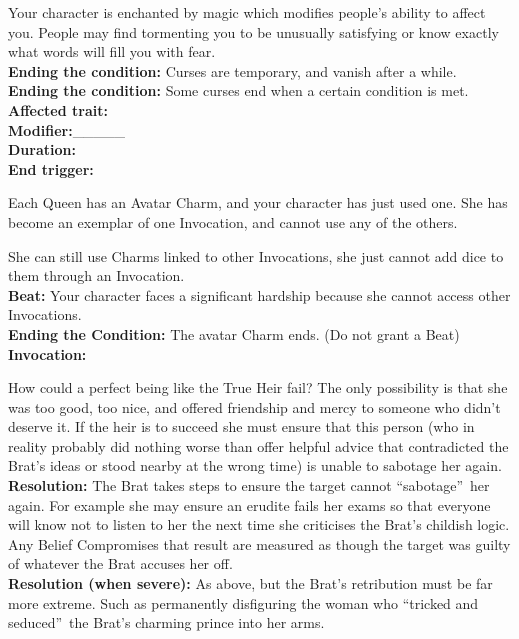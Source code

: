 \documentclass[10pt, frontgrid, backgrid]{flacards}
\begin{document}
{Your character is enchanted by magic which modifies people's ability to affect you. People may find tormenting you to be unusually satisfying or know exactly what words will fill you with fear.\\
\textbf{Ending the condition:} Curses are temporary, and vanish after a while.\\
\textbf{Ending the condition:} Some curses end when a certain condition is met.\\
\textbf{Affected trait:}\fillunderline\\
\textbf{Modifier:}\_\_\_\_\_\\
\textbf{Duration:}\fillunderline\\
\textbf{End trigger:}\fillunderline}

{Each Queen has an Avatar Charm, and your character has just used one. She has become an exemplar of one Invocation, and cannot use any of the others. 

She can still use Charms linked to other Invocations, she just cannot add dice to them through an Invocation.\\
\textbf{Beat:} Your character faces a significant hardship because she cannot access other Invocations. \\
\textbf{Ending the Condition:} The avatar Charm ends. (Do not grant a Beat)\\
\textbf{Invocation:} \fillunderline}

{
How could a perfect being like the True Heir fail? The only possibility is that she was too good, too nice, and offered friendship and mercy to someone who didn't deserve it. If the heir is to succeed she must ensure that this person (who in reality probably did nothing worse than offer helpful advice that contradicted the Brat's ideas or stood nearby at the wrong time) is unable to sabotage her again. \\
\textbf{Resolution:} The Brat takes steps to ensure the target cannot \textquotedblleft sabotage\textquotedblright\, her again. For example she may ensure an erudite fails her exams so that everyone will know not to listen to her the next time she criticises the Brat's childish logic. Any Belief Compromises that result are measured as though the target was guilty of whatever the Brat accuses her off. \\
\textbf{Resolution (when severe):} As above, but the Brat's retribution must be far more extreme. Such as permanently disfiguring the woman who \textquotedblleft tricked and seduced\textquotedblright\, the Brat's charming prince into her arms. 
}
\end{document}
